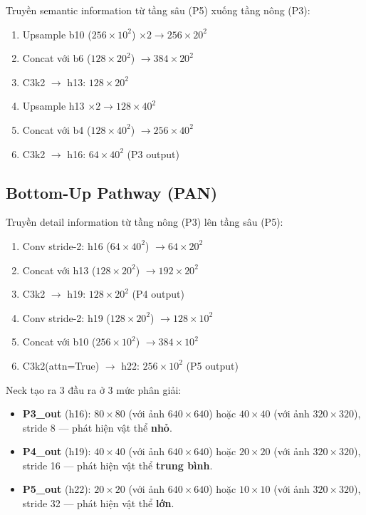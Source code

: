 Truyền semantic information từ tầng sâu (P5) xuống tầng nông (P3):

\begin{enumerate}
    \item Upsample b10 ($256 \times 10^2$) $\times 2 \to 256 \times 20^2$
    \item Concat với b6 ($128 \times 20^2$) $\to 384 \times 20^2$
    \item C3k2 $\to$ h13: $128 \times 20^2$
    \item Upsample h13 $\times 2 \to 128 \times 40^2$
    \item Concat với b4 ($128 \times 40^2$) $\to 256 \times 40^2$
    \item C3k2 $\to$ h16: $64 \times 40^2$ \quad (P3 output)
\end{enumerate}

\subsection{Bottom-Up Pathway (PAN)}

Truyền detail information từ tầng nông (P3) lên tầng sâu (P5):

\begin{enumerate}
    \item Conv stride-2: h16 ($64 \times 40^2$) $\to 64 \times 20^2$
    \item Concat với h13 ($128 \times 20^2$) $\to 192 \times 20^2$
    \item C3k2 $\to$ h19: $128 \times 20^2$ \quad (P4 output)
    \item Conv stride-2: h19 ($128 \times 20^2$) $\to 128 \times 10^2$
    \item Concat với b10 ($256 \times 10^2$) $\to 384 \times 10^2$
    \item C3k2(attn=True) $\to$ h22: $256 \times 10^2$ \quad (P5 output)
\end{enumerate}

Neck tạo ra 3 đầu ra ở 3 mức phân giải:
\begin{itemize}
    \item \textbf{P3\_out} (h16): $80 \times 80$ (với ảnh $640\times640$) hoặc $40 \times 40$ (với ảnh $320\times320$), stride 8 --- phát hiện vật thể \textbf{nhỏ}.
    \item \textbf{P4\_out} (h19): $40 \times 40$ (với ảnh $640\times640$) hoặc $20 \times 20$ (với ảnh $320\times320$), stride 16 --- phát hiện vật thể \textbf{trung bình}.
    \item \textbf{P5\_out} (h22): $20 \times 20$ (với ảnh $640\times640$) hoặc $10 \times 10$ (với ảnh $320\times320$), stride 32 --- phát hiện vật thể \textbf{lớn}.
\end{itemize}

